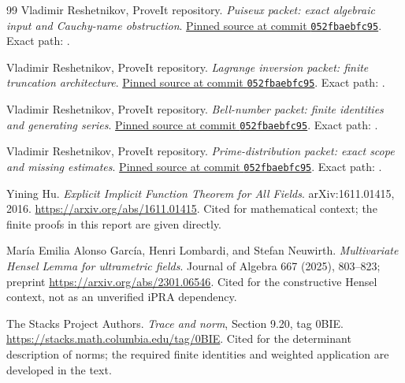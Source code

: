 \begin{thebibliography}{99}
 Vladimir Reshetnikov, ProveIt repository.
\emph{Puiseux packet: exact algebraic input and Cauchy-name obstruction}.
\href{https://github.com/VladimirReshetnikov/ProveIt/blob/052fbaebfc955294b4c02f6532ab7e7a3f760f7a/Logic/PrimitiveRecursiveArithmetic/docs/proofs/algebra/puiseux_ipra/README.md}{Pinned source at commit \texttt{052fbaebfc95}}.
Exact path: .

 Vladimir Reshetnikov, ProveIt repository.
\emph{Lagrange inversion packet: finite truncation architecture}.
\href{https://github.com/VladimirReshetnikov/ProveIt/blob/052fbaebfc955294b4c02f6532ab7e7a3f760f7a/Logic/PrimitiveRecursiveArithmetic/docs/proofs/algebra/lagrange_inversion_ipra/README.md}{Pinned source at commit \texttt{052fbaebfc95}}.
Exact path: .

 Vladimir Reshetnikov, ProveIt repository.
\emph{Bell-number packet: finite identities and generating series}.
\href{https://github.com/VladimirReshetnikov/ProveIt/blob/052fbaebfc955294b4c02f6532ab7e7a3f760f7a/Logic/PrimitiveRecursiveArithmetic/docs/proofs/combinatorics/bell_numbers_ipra/paper/03_series.tex}{Pinned source at commit \texttt{052fbaebfc95}}.
Exact path: .

 Vladimir Reshetnikov, ProveIt repository.
\emph{Prime-distribution packet: exact scope and missing estimates}.
\href{https://github.com/VladimirReshetnikov/ProveIt/blob/052fbaebfc955294b4c02f6532ab7e7a3f760f7a/Logic/PrimitiveRecursiveArithmetic/docs/proofs/analytic-number-theory/prime_distribution_ipra/paper/sections/01_scope.tex}{Pinned source at commit \texttt{052fbaebfc95}}.
Exact path: .

 Yining Hu.
\emph{Explicit Implicit Function Theorem for All Fields}.
arXiv:1611.01415, 2016. \url{https://arxiv.org/abs/1611.01415}.
Cited for mathematical context; the finite proofs in this report are given directly.

 Mar\'ia Emilia Alonso Garc\'ia,
Henri Lombardi, and Stefan Neuwirth.
\emph{Multivariate Hensel Lemma for ultrametric fields}.
Journal of Algebra 667 (2025), 803--823;
preprint \url{https://arxiv.org/abs/2301.06546}.
Cited for the constructive Hensel context, not as an unverified iPRA dependency.

 The Stacks Project Authors.
\emph{Trace and norm}, Section 9.20, tag 0BIE.
\url{https://stacks.math.columbia.edu/tag/0BIE}.
Cited for the determinant description of norms; the required finite identities
and weighted application are developed in the text.
\end{thebibliography}
